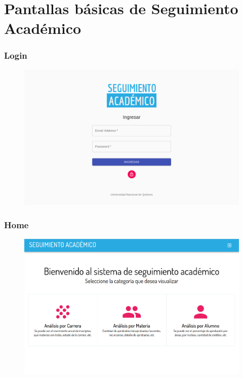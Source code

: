 \section{Pantallas básicas de Seguimiento Académico}

\subsubsection{Login}
\begin{figure}[!htbp]
  \centering
    \includegraphics[scale=0.3]{images/seguimiento-academico/sa-login.png}
  \label{fig:sa-login}
\end{figure}

\subsubsection{Home}
\begin{figure}[!htbp]
  \centering
    \includegraphics[scale=0.3]{images/seguimiento-academico/sa-home.png}
  \label{fig:sa-home}
\end{figure}

